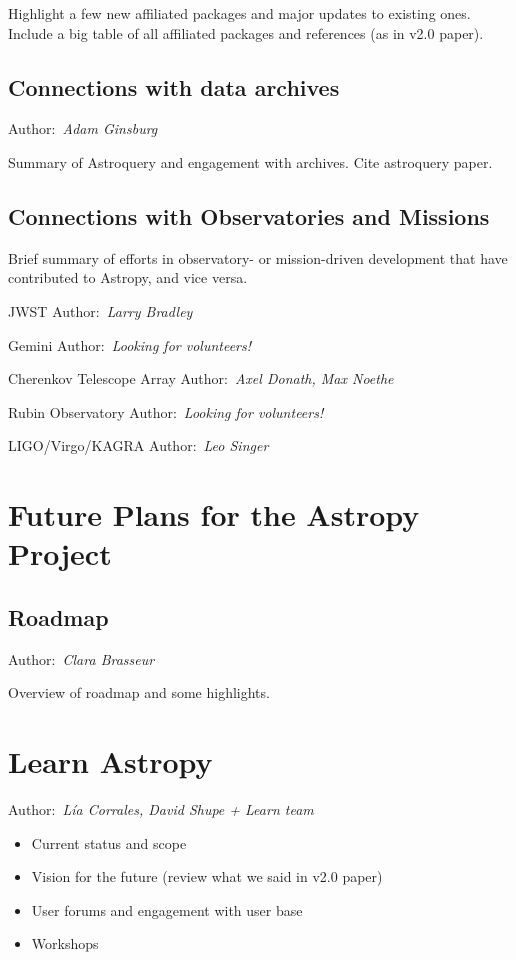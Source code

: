 \documentclass[modern]{aastex631}
\newcommand{\secauthor}[1]{{\color{blue}Author:~\textit{#1}}}
\newcommand{\secunfilled}{{\color{red}Author:~\textit{Looking for volunteers!}}}
\begin{document}
Highlight a few new affiliated packages and major updates to existing ones.
Include a big table of all affiliated packages and references (as in v2.0
paper).

\subsection{Connections with data archives}

\secauthor{Adam Ginsburg}

Summary of Astroquery and engagement with archives. Cite astroquery paper.

\subsection{Connections with Observatories and Missions}

Brief summary of efforts in observatory- or mission-driven development that have
contributed to Astropy, and vice versa.

JWST
\secauthor{Larry Bradley}

Gemini
\secunfilled

Cherenkov Telescope Array
\secauthor{Axel Donath, Max Noethe}

Rubin Observatory
\secunfilled

LIGO/Virgo/KAGRA
\secauthor{Leo Singer}
\section{Future Plans for the Astropy Project} \label{sec:future}

\subsection{Roadmap}

\secauthor{Clara Brasseur}

Overview of roadmap and some highlights.

\section{Learn Astropy} \label{sec:learn}

\secauthor{Lía Corrales, David Shupe + Learn team}

\begin{itemize}
\item Current status and scope
\item Vision for the future (review what we said in v2.0 paper)
\item User forums and engagement with user base
\item Workshops
\end{itemize}
\end{document}
